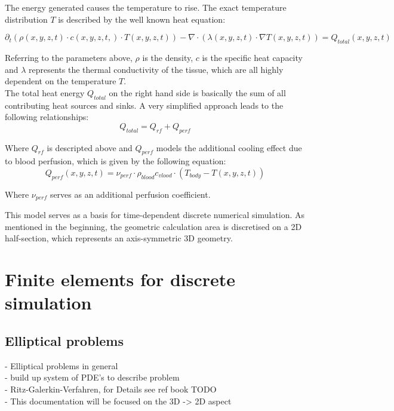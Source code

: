\documentclass[parskip=half, titlepage=yes, 12pt, BCOR=12mm, DIV=calc]{scrartcl}
\begin{document}
The energy generated causes the temperature to rise. The exact temperature distribution $T$ is described by the well known heat equation:

\begin{equation}
    \partial_t (\rho(x,y,z,t) \cdot c(x,y,z,t,) \cdot T(x,y,z,t)) - \nabla \cdot (\lambda(x,y,z,t) \cdot \nabla T(x,y,z,t)) = Q_{total}(x,y,z,t)
\end{equation}

Referring to the parameters above, $\rho$ is the density, $c$ is the specific heat capacity and $\lambda$ represents the thermal conductivity of the tissue, which are all highly dependent on the temperature $T$. \\
The total heat energy $Q_{total}$ on the right hand side is basically the sum of all contributing heat sources and sinks. A very simplified approach leads to the following relationships:
\begin{equation}
    Q_{total} = Q_{rf} + Q_{perf}
\end{equation}

Where $Q_{rf}$ is descripted above and $Q_{perf}$ models the additional cooling effect due to blood perfusion, which is given by the following equation:
\begin{equation}
    Q_{perf}(x,y,z,t) = \nu_{perf} \cdot \rho_{blood} c_{vlood} \cdot (T_{body} - T(x,y,z,t))
\end{equation}
 
 Where $\nu_{perf}$ serves as an additional perfusion coefficient.

This model serves as a basis for time-dependent discrete numerical simulation. As mentioned in the beginning, the geometric calculation area is discretised on a 2D half-section, which represents an axis-symmetric 3D geometry. 


\section{Finite elements for discrete simulation}

\subsection{Elliptical problems}
- Elliptical problems in general \\
- build up system of PDE's to describe problem \\

- Ritz-Galerkin-Verfahren, for Details see ref book TODO \\
- This documentation will be focused on the 3D -> 2D aspect
\end{document}
